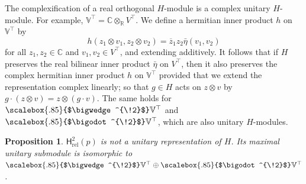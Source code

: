 \documentclass[11pt,reqno,a4paper,final]{amsart}
\newcommand\ext[1]{\scalebox{.85}{$\bigwedge^{\!#1}$}}
\newcommand\sym[1]{\scalebox{.85}{$\bigodot^{\!#1}$}}
\theoremstyle{plain}
\newtheorem{proposition}[lemma]{Proposition}
\theoremstyle{definition}
\newcommand{\Hrel}{\mathsf{H}_{\mathrm{rel}}}
\newcommand{\VV}{\mathbb{V}}
\newcommand{\RR}{\mathbb{R}}
\newcommand{\CC}{\mathbb{C}}
\newcommand{\1}{\mathbb{1}}
\numberwithin{equation}{section}
\begin{document}
The complexification of a real orthogonal $H$-module
is a complex unitary $H$-module.  For example, $\VV^\top = \CC
\otimes_\RR V^\top$.  We define a hermitian inner product $h$ on
$\VV^\top$ by
\begin{equation}
  h( z_1 \otimes v_1, z_2 \otimes v_2) = \overline{z}_1 z_2 \bar\eta(v_1,v_2)
\end{equation}
for all $z_1,z_2 \in \CC$ and $v_1,v_2 \in V^\top$, and extending
additively.  It follows that if $H$ preserves the real bilinear inner
product $\bar\eta$ on $V^\top$, then it also preserves the complex
hermitian inner product $h$ on $\VV^\top$ provided that we extend the
representation complex linearly; so that $g \in H$ acts on $z \otimes
v$ by $g \cdot (z \otimes v) = z \otimes (g \cdot v)$.  The same holds
for $\ext{2}\VV^\top$ and $\sym{2}\VV^\top$, which are also unitary
$H$-modules.

\begin{proposition} \label{prop:Hrel2_not_unitary}
  $\Hrel^2(p)$ is not a unitary representation of $H$. Its maximal
  unitary submodule is isomorphic to $\ext{2}\VV^\top \oplus
  \sym{2}\VV^\top$.
\end{proposition}
\end{document}
